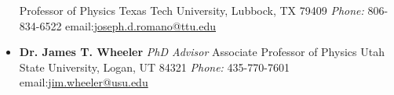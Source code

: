 \documentclass[11pt,letterpaper,sans,unicode]{moderncv}
\begin{document}
\begin{itemize}[leftmargin=8mm]
       		\newline Professor of Physics
		\newline Texas Tech University, Lubbock, TX 79409
		\newline \emph{Phone:} 806-834-6522 \qquad email:\url{joseph.d.romano@ttu.edu}
		\newline
	\item \textbf{Dr. James T. Wheeler} \emph{PhD Advisor}
        		\newline Associate Professor of Physics
		\newline Utah State University, Logan, UT 84321
		\newline \emph{Phone:} 435-770-7601 \qquad email:\url{jim.wheeler@usu.edu}
		\newline

  \begin{comment}
	\item \textbf{Dr. Tevian Dray} \emph{MS Advisor, Oregon State University}
     		\newline Professor of Mathematics
		\newline Oregon State University, Corvallis, OR 97331
		\newline \emph{Phone:} 	541-737-5159 \qquad \emph{email:} \url{tevian@math.oregonstate.edu}
		\newline
	\item \textbf{Dr. Jan Sojka}
        		\newline Department Chair \& Professor of Physics
		\newline Utah State University, Logan, UT 84321
		\newline \emph{Phone:} 435-797-2857 \qquad email: \url{jan.sojka@usu.edu}
		\newline
	\item \textbf{Dr. Damon T. Spayde} %
       		\newline Department Chair \& Associate Professor of Physics
		\newline Hendrix College, Conway, AR 72032
		\newline \emph{Phone:} 501-450-1251 \qquad email:\url{spayde@hendrix.edu}
		\newline
	\item \textbf{Dr. Shane Larson} \emph{Collaborator}
        		\newline Research Associate Professor
		\newline Center for Interdisciplinary Exploration and Research in Astrophysics (CIERA)
		\newline Northwestern University, Evanston, IL 60208

\end{comment}
\end{itemize}
\end{document}
